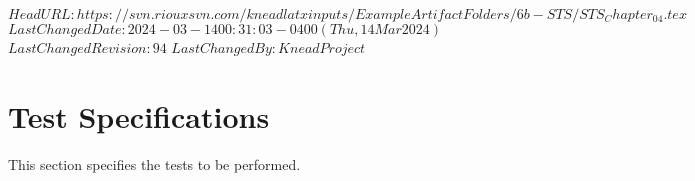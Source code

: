 \svnidlong
{$HeadURL: https://svn.riouxsvn.com/kneadlatxinputs/ExampleArtifactFolders/6b-STS/STS_Chapter_04.tex $}
{$LastChangedDate: 2024-03-14 00:31:03 -0400 (Thu, 14 Mar 2024) $}
{$LastChangedRevision: 94 $}
{$LastChangedBy: KneadProject $}

\chapter{Test Specifications}
\label{loc:TestSpecifications}
% 

This section specifies the tests to be performed.
\newcommand{\StsTestCaseID}{Packets}%

\newcommand{\StsTestSpecID}{WiFi Test}%



\newcommand{\StsTestCaseID}{Waterproof}%

\newcommand{\StsTestSpecID}{Waterproof Test}%

\newcommand{\StsTestCaseID}{Env}%

\newcommand{\StsTestSpecID}{Environmental Threshold Test}%
